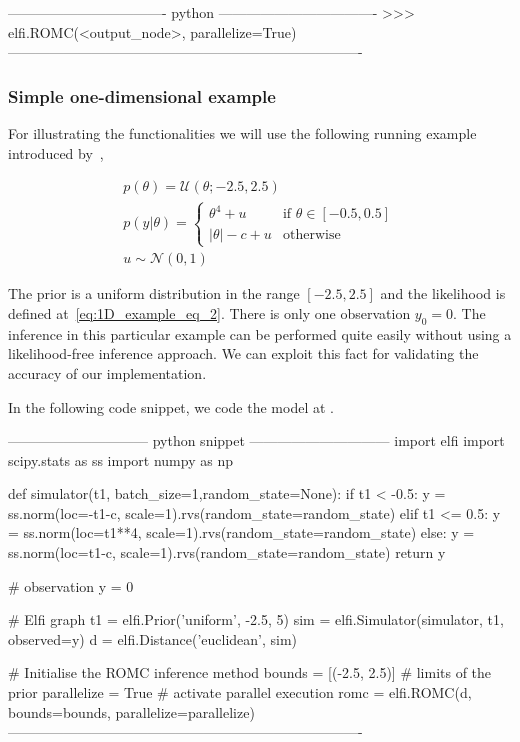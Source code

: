 \begin{Code}
---------------------------------- python ----------------------------------
>>> elfi.ROMC(<output_node>, parallelize=True)
----------------------------------------------------------------------------
\end{Code}
  
\subsubsection*{Simple one-dimensional example}

For illustrating the functionalities we will use the following running
example introduced by~\cite{Ikonomov2019},

\begin{gather} \label{eq:1D_example}
  p(\theta) = \mathcal{U}(\theta;-2.5,2.5)\\ \label{eq:1D_example_eq_2}
  p(y|\theta) = \left\{
    \begin{array}{ll} \theta^4 + u & \mbox{if } \theta \in [-0.5, 0.5]
\\ |\theta| - c + u & \mbox{otherwise}
    \end{array} \right.\\ 
  u \sim \mathcal{N}(0,1)
\end{gather}

\noindent

The prior is a uniform distribution in the range $[-2.5, 2.5]$ and the
likelihood is defined at~\ref{eq:1D_example_eq_2}. There is only one
observation $y_0 = 0$. The inference in this particular example can be
performed quite easily without using a likelihood-free inference
approach. We can exploit this fact for validating the accuracy of our
implementation.

In the following code snippet, we code the model at .

\begin{Code}
------------------------------ python snippet ------------------------------
  import elfi import scipy.stats as ss
  import numpy as np

  def simulator(t1, batch_size=1,random_state=None):
    if t1 < -0.5:
        y = ss.norm(loc=-t1-c, scale=1).rvs(random_state=random_state)
    elif t1 <= 0.5:
        y = ss.norm(loc=t1**4, scale=1).rvs(random_state=random_state)
    else:
        y = ss.norm(loc=t1-c, scale=1).rvs(random_state=random_state)
    return y

  # observation
  y = 0
      
  # Elfi graph
  t1 = elfi.Prior('uniform', -2.5, 5)
  sim = elfi.Simulator(simulator, t1, observed=y)
  d = elfi.Distance('euclidean', sim)

  # Initialise the ROMC inference method
  bounds = [(-2.5, 2.5)] # limits of the prior
  parallelize = True # activate parallel execution
  romc = elfi.ROMC(d, bounds=bounds, parallelize=parallelize)
----------------------------------------------------------------------------    
\end{Code}
